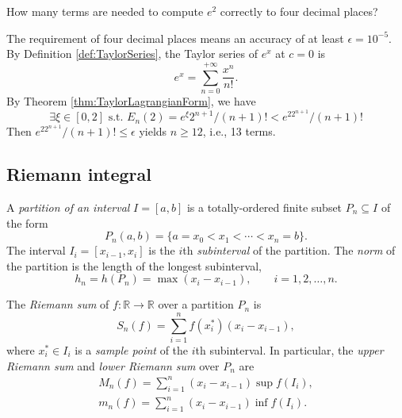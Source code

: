 \begin{exm}
  \label{exm:approximatingExponentialFunction}
  How many terms are needed to compute $e^2$ correctly to four decimal
  places?

  The requirement of four decimal places means
  an accuracy of at least $\epsilon=10^{-5}$.
By Definition \ref{def:TaylorSeries}, 
   the Taylor series of $e^x$ at $c=0$ is
  \begin{equation*}
    e^x = \sum_{n=0}^{+\infty}\frac{x^n}{n!}.
  \end{equation*}
  By Theorem \ref{thm:TaylorLagrangianForm}, we have
  \begin{equation*}
    \exists \xi\in [0,2] \text{ s.t. }
    E_n(2)=e^{\xi}2^{n+1}/(n+1)! < e^22^{n+1}/(n+1)!
  \end{equation*}
  Then $e^22^{n+1}/(n+1)!\le \epsilon$ yields $n\ge 12$, i.e., 13 terms.
\end{exm}


\subsection{Riemann integral}
\label{sec:RiemannIntegral}

\begin{defn}
  \label{def:partitionOfInterval}
  A \emph{partition of an interval} $I=[a, b]$
  is a totally-ordered finite subset $P_n\subseteq I$ of the form
  \begin{equation}
    \label{eq:partition}
    P_n(a,b) = \{a=x_0 < x_1 < \cdots < x_n=b\}.
  \end{equation}
  The interval $I_i=[x_{i-1}, x_{i}]$ is the $i$th
   \emph{subinterval} of the partition.
  The \emph{norm} of the partition
  is the length of the longest subinterval,
  \begin{equation}
    h_n= h(P_n) = \max(x_i-x_{i-1}),\qquad i=1, 2, \ldots, n.
  \end{equation}
\end{defn}

\begin{defn}
  \label{def:RiemannSum}
  The \emph{Riemann sum} of %
  $f: \mathbb{R}\rightarrow \mathbb{R}$
  over a partition $P_n$ is
  \begin{equation}
    \label{eq:RiemannSum}
    S_n(f) = \sum_{i=1}^n f(x_i^*) (x_{i}-x_{i-1}),
  \end{equation}
  where $x_i^*\in I_i$ 
  is a \emph{sample point} %
  of the $i$th subinterval.
  In particular, the \emph{upper Riemann sum}
  and \emph{lower Riemann sum} over $P_n$ are
  \begin{align}
    \label{eq:upperRiemannSum}
    M_n(f) = \sum_{i=1}^n (x_{i}-x_{i-1}) \sup f(I_i), 
    \\
    \label{eq:lowerRiemannSum}
    m_n(f) = \sum_{i=1}^n (x_{i}-x_{i-1}) \inf f(I_i). 
  \end{align}
\end{defn}

